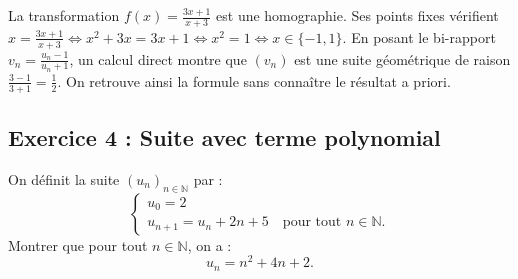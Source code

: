 \documentclass[11pt,a4paper]{article}
\newcommand{\N}{\mathbb{N}}
\begin{document}
\begin{remarquabox}
La transformation $f(x) = \frac{3x+1}{x+3}$ est une homographie. Ses points fixes vérifient $x = \frac{3x+1}{x+3} \iff x^2 + 3x = 3x + 1 \iff x^2 = 1 \iff x \in \{-1, 1\}$.
En posant le bi-rapport $v_n = \frac{u_n - 1}{u_n + 1}$, un calcul direct montre que $(v_n)$ est une suite géométrique de raison $\frac{3 - 1}{3 + 1} = \frac{1}{2}$. On retrouve ainsi la formule sans connaître le résultat a priori.
\end{remarquabox}

\subsection*{Exercice 4 : Suite avec terme polynomial}

On définit la suite $(u_n)_{n \in \N}$ par :
\[
\begin{cases}
u_0 = 2 \\
u_{n+1} = u_n + 2n + 5 \quad \text{pour tout } n \in \N.
\end{cases}
\]
Montrer que pour tout $n \in \N$, on a :
\[
u_n = n^2 + 4n + 2.
\]
\end{document}
